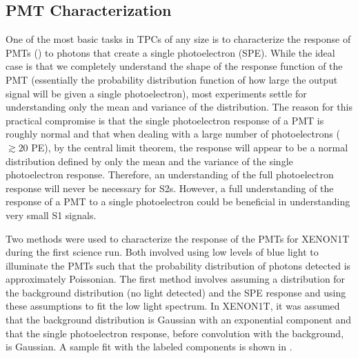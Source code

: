 
\subsection{PMT Characterization}
\label{sec:xe1t_pmt}

One of the most basic tasks in TPCs of any size is to characterize the response of PMTs () to photons that create a single photoelectron (SPE).  While the ideal case is that we completely understand the shape of the response function of the PMT (essentially the probability distribution function of how large the output signal will be given a single photoelectron), most experiments settle for understanding only the mean and variance of the distribution.  The reason for this practical compromise is that the single photoelectron response of a PMT is roughly normal and that when dealing with a large number of photoelectrons ($\gtrsim 20$ PE), by the central limit theorem, the response will appear to be a normal distribution defined by only the mean and the variance of the single photoelectron response.  Therefore, an understanding of the full photoelectron response will never be necessary for S2s.  However, a full understanding of the response of a PMT to a single photoelectron could be beneficial in understanding very small S1 signals.

Two methods were used to characterize the response of the PMTs for XENON1T during the first science run.  Both involved using low levels of blue light to illuminate the PMTs such that the probability distribution of photons detected is approximately Poissonian.  The first method involves assuming a distribution for the background distribution (no light detected) and the SPE response and using these assumptions to fit the low light spectrum.  In XENON1T, it was assumed that the background distribution is Gaussian with an exponential component and that the single photoelectron response, before convolution with the background, is Gaussian.  A sample fit with the labeled components is shown in .



